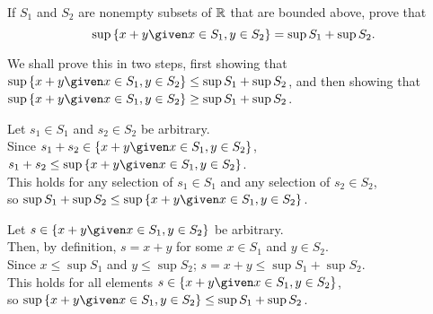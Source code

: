 \begin{problem}
  If $S_1$ and $S_2$ are nonempty subsets of $\mathbb{R}$ that are bounded above,
  prove that \[ \sup \set{x + y \given x \in S_1, y \in S_2} = \sup S_1 + \sup S_2. \]
\end{problem}

\begin{answer}
  We shall prove this in two steps, first showing that
  $\sup \set{x + y \given x \in S_1, y \in S_2} \leq \sup S_1 + \sup S_2$,
  and then showing that $\sup \set{x + y \given x \in S_1, y \in S_2} \geq \sup S_1 + \sup S_2$.

  \begin{enumroman}
    \item Let $s_1 \in S_1$ and $s_2 \in S_2$ be arbitrary. \\
      Since $s_1 + s_2 \in \set{x + y \given x \in S_1, y \in S_2}$, $s_1 + s_2 \leq \sup \set{x + y \given x \in S_1, y \in S_2}$. \\
      This holds for any selection of $s_1 \in S_1$ and any selection of $s_2 \in S_2$, \\
      so $\sup S_1 + \sup S_2 \leq \sup \set{x + y \given x \in S_1, y \in S_2}$.
    \item Let $s \in \set{x + y \given x \in S_1, y \in S_2}$ be arbitrary. \\
      Then, by definition, $s = x + y$ for some $x \in S_1$ and $y \in S_2$. \\
      Since $x \leq \sup S_1$ and $y \leq \sup S_2$; $s = x + y \leq \sup S_1 + \sup S_2$. \\
      This holds for all elements $s \in \set{x + y \given x \in S_1, y \in S_2}$, \\
      so $\sup \set{x + y \given x \in S_1, y \in S_2} \leq \sup S_1 + \sup S_2$.
      
  \end{enumroman}

\end{answer}

